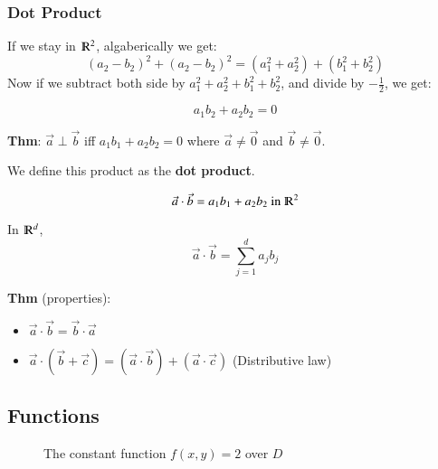 \documentclass [12 pt, twoside] {book}
\newcommand\+{\text{ }}
\begin{document}
\subsubsection{Dot Product}
If we stay in
$\varmathbb{R}^2$, algaberically we get:
$$(a_2 - b_2)^2 + (a_2 - b_2)^2 = (a_1^2 + a_2^2) + (b_1^2 + b_2^2)$$
Now if we subtract both side by $a_1^2 + a_2^2 + b_1^2 + b_2^2$, and divide
by $-\frac{1}{2}$, we get:

$$a_1b_2 + a_2b_2 = 0$$

\textbf{Thm}: $\vec{a} \perp \vec{b}$ iff $a_1b_1 + a_2b_2 = 0$ where
$\vec{a} \neq \vec{0}$ and $\vec{b} \neq \vec{0}$.

We define this product as the \textbf{dot product}.

$$\vec{a} \cdot \vec{b} = a_1b_1 + a_2b_2 \text{ in } \varmathbb{R}^2$$

In $\varmathbb{R}^d$,
$$\vec{a} \cdot \vec{b} = \sum_{j = 1}^d a_jb_j$$

\textbf{Thm} (properties):
\begin{itemize}
    \item $\vec{a} \cdot \vec{b} = \vec{b} \cdot \vec{a}$
    \item $\vec{a} \cdot (\vec{b} + \vec{c}) = (\vec{a} \cdot \vec{b}) + (\vec{a}
        \cdot \vec{c})$ (Distributive law)
\end{itemize}

\subsection{Functions}
\begin{figure}[ht]
\centering
{}
\caption{The constant function $f(x, y) = 2$ over $D$}
\end{figure}
\end{document}

